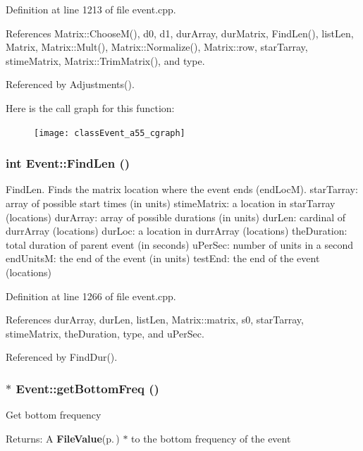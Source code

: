 Definition at line 1213 of file event.cpp.

References Matrix::Choose\-M(), d0, d1, dur\-Array, dur\-Matrix, Find\-Len(), list\-Len, Matrix, Matrix::Mult(), Matrix::Normalize(), Matrix::row, star\-Tarray, stime\-Matrix, Matrix::Trim\-Matrix(), and type.

Referenced by Adjustments().

Here is the call graph for this function:\begin{figure}[H]
\begin{center}
\leavevmode
\texttt{[image: classEvent\_a55\_cgraph]}
\end{center}
\end{figure}
\subsubsection{\setlength{\rightskip}{0pt plus 5cm}int Event::Find\-Len ()}\label{classEvent_a56}


Find\-Len. Finds the matrix location where the event ends (end\-Loc\-M). star\-Tarray: array of possible start times (in units) stime\-Matrix: a location in star\-Tarray (locations) dur\-Array: array of possible durations (in units) dur\-Len: cardinal of durr\-Array (locations) dur\-Loc: a location in durr\-Array (locations) the\-Duration: total duration of parent event (in seconds) u\-Per\-Sec: number of units in a second end\-Units\-M: the end of the event (in units) test\-End: the end of the event (locations) 

Definition at line 1266 of file event.cpp.

References dur\-Array, dur\-Len, list\-Len, Matrix::matrix, s0, star\-Tarray, stime\-Matrix, the\-Duration, type, and u\-Per\-Sec.

Referenced by Find\-Dur().
\subsubsection{$\ast$ Event::get\-Bottom\-Freq ()\hspace{0.3cm}{\tt  [inline]}}\label{classEvent_a60}


Get bottom frequency \begin{Desc}
\item[Returns:]A {\bf File\-Value}{\rm (p.\,\pageref{classFileValue})} $\ast$ to the bottom frequency of the event \end{Desc}



